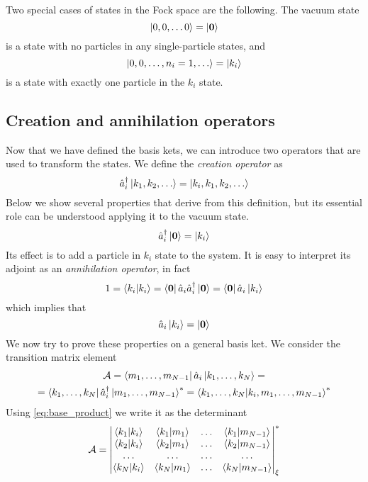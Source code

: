 Two special cases of states in the Fock space are the following. The vacuum state
\begin{equation}
    \ket{0,0,\dots0} = \ket{\mathbf{\boldsymbol{0}}}
\end{equation}
is a state with no particles in any single-particle states, and
\begin{equation}
    \ket{0,0,\dots, n_i = 1, \dots} = \ket{k_i}
\end{equation}
is a state with exactly one particle in the $k_i$ state.

\subsection{Creation and annihilation operators}
Now that we have defined the basis kets, we can introduce two operators that are used to transform the states. We define the \emph{creation operator} as
\begin{equation} \label{eq:creation_definition}
    \hat{a}_i^\dagger \ket{k_1, k_2, \dots} = \ket{k_i,k_1, k_2, \dots}
\end{equation}
Below we show several properties that derive from this definition, but its essential role can be understood applying it to the vacuum state.
\begin{equation}
    \hat{a}_i^\dagger \ket{\mathbf{\boldsymbol{0}}} = \ket{k_i}
\end{equation}
Its effect is to add a particle in $k_i$ state to the system. It is easy to interpret its adjoint as an \emph{annihilation operator}, in fact
\begin{equation}
    1 = \braket{k_i}{k_i} = \bra{\mathbf{\boldsymbol{0}}}\hat{a}_i\hat{a}_i^\dagger\ket{\mathbf{\boldsymbol{0}}} = \bra{\mathbf{\boldsymbol{0}}}\hat{a}_i\ket{k_i}
\end{equation}
which implies that
\begin{equation}
    \hat{a}_i\ket{k_i} = \ket{\mathbf{\boldsymbol{0}}}
\end{equation}
We now try to prove these properties on a general basis ket. We consider the transition matrix element
\begin{multline} \label{eq:annihilation_matrix}
    \mathcal{A} =  \bra{m_1, \dots, m_{N-1}} \hat{a}_i \ket{k_1, \dots, k_N} =
    \\ =  \bra{k_1, \dots, k_N} \hat{a}_i^\dagger \ket{m_1, \dots, m_{N-1}}^*
    = \bra{k_1, \dots, k_N} \ket{k_i, m_1, \dots, m_{N-1}}^*
\end{multline}
Using \cref{eq:base_product} we write it as the determinant
\begin{equation}
    \mathcal{A} = \begin{vmatrix}
        \braket{k_1}{k_i} & \braket{k_1}{m_1} & \dots & \braket{k_1}{m_{N-1} } \\
        \braket{k_2}{k_i} & \braket{k_2}{m_1} & \dots & \braket{k_2}{m_{N-1}}  \\
        \dots             & \dots             & \dots & \dots                  \\
        \braket{k_N}{k_i} & \braket{k_N}{m_1} & \dots & \braket{k_N}{m_{N-1}}  \\
    \end{vmatrix}_\xi^*
\end{equation}
